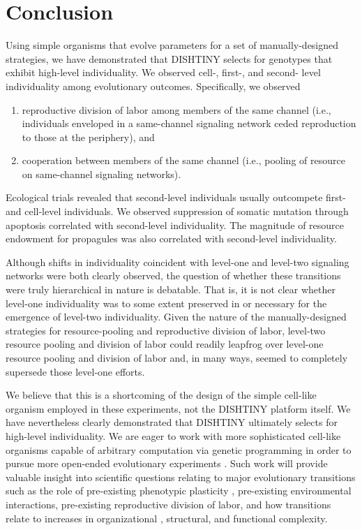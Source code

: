 \section{Conclusion}

Using simple organisms that evolve parameters for a set of manually-designed strategies, we have demonstrated that DISHTINY selects for genotypes that exhibit high-level individuality.
We observed cell-, first-, and second- level individuality among evolutionary outcomes.
Specifically, we observed
\begin{enumerate}
  \item reproductive division of labor among members of the same channel (i.e., individuals enveloped in a same-channel signaling network ceded reproduction to those at the periphery), and
  \item cooperation between members of the same channel (i.e., pooling of resource on same-channel signaling networks).
\end{enumerate}

Ecological trials revealed that second-level individuals usually outcompete first- and cell-level individuals.
We observed suppression of somatic mutation through apoptosis correlated with second-level individuality.
The magnitude of resource endowment for propagules was also correlated with second-level individuality.

Although shifts in individuality coincident with level-one and level-two signaling networks were both clearly observed, the question of whether these transitions were truly hierarchical in nature is debatable.
That is, it is not clear whether level-one individuality was to some extent preserved in or necessary for the emergence of level-two individuality.
Given the nature of the manually-designed strategies for resource-pooling and reproductive division of labor, level-two resource pooling and division of labor could readily leapfrog over level-one resource pooling and division of labor and, in many ways, seemed to completely supersede those level-one efforts.

We believe that this is a shortcoming of the design of the simple cell-like organism employed in these experiments, not the DISHTINY platform itself.
We have nevertheless clearly demonstrated that DISHTINY ultimately selects for high-level individuality.
We are eager to work with more sophisticated cell-like organisms capable of arbitrary computation via genetic programming in order to pursue more open-ended evolutionary experiments \cite{ofria2004avida}.
Such work will provide valuable insight into scientific questions relating to major evolutionary transitions such as the role of pre-existing phenotypic plasticity \citep{clune2007investigating, lalejini2016evolutionary}, pre-existing environmental interactions, pre-existing reproductive division of labor, and how transitions relate to increases in organizational \citep{goldsby2012task}, structural, and functional \citep{goldsby2014evolutionary} complexity.

